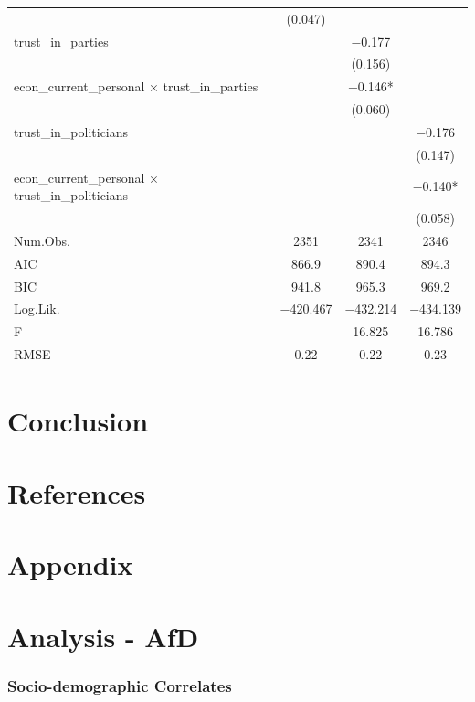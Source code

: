 \documentclass[
]{article}
\begin{document}
\begin{table}
\begin{tabular}[t]{lccc}
 & (\num{0.047}) &  & \\
trust\_in\_parties &  & \num{-0.177} & \\
 &  & (\num{0.156}) & \\
econ\_current\_personal × trust\_in\_parties &  & \num{-0.146}* & \\
 &  & (\num{0.060}) & \\
trust\_in\_politicians &  &  & \num{-0.176}\\
 &  &  & (\num{0.147})\\
econ\_current\_personal × trust\_in\_politicians &  &  & \num{-0.140}*\\
 &  &  & (\num{0.058})\\
\midrule
Num.Obs. & \num{2351} & \num{2341} & \num{2346}\\
AIC & \num{866.9} & \num{890.4} & \num{894.3}\\
BIC & \num{941.8} & \num{965.3} & \num{969.2}\\
Log.Lik. & \num{-420.467} & \num{-432.214} & \num{-434.139}\\
F &  & \num{16.825} & \num{16.786}\\
RMSE & \num{0.22} & \num{0.22} & \num{0.23}\\
\bottomrule
\end{tabular}
\end{table}

\hypertarget{conclusion}{%
\section{Conclusion}\label{conclusion}}

\hypertarget{references}{%
\section{References}\label{references}}

\hypertarget{appendix}{%
\section{Appendix}\label{appendix}}

\hypertarget{analysis---afd}{%
\section{Analysis - AfD}\label{analysis---afd}}

\hypertarget{socio-demographic-correlates}{%
\subsubsection{Socio-demographic
Correlates}\label{socio-demographic-correlates}}
\end{document}
